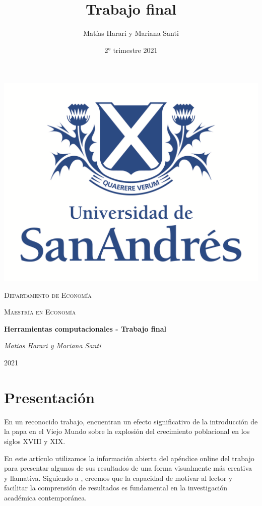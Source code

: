 \documentclass[10.5pt]{article}   %
\title{Trabajo final}
\author{Matías Harari y Mariana Santi}
\date{2° trimestre 2021}
\begin{document}
\renewcommand{\thesubsection}{\thesection.\alph{subsection}}

\thispagestyle{empty}
\setlength\headheight{0pt} 
\begin{center}

\begin{center}
\includegraphics[width=0.65\linewidth]{imgs/logoudesa.png}            
\end{center}	

        \vspace{0.2cm}
        {\scshape\LARGE Departamento de Economía \par}
        \vspace{0.2cm}
        {\scshape\Large Maestría en Economía\par}
        \vspace{0.4cm}

        {\Large\bfseries Herramientas computacionales - Trabajo final}
        
        \vspace{1cm}
        {\Large\itshape Matias Harari y Mariana Santi \par}


\vspace{1cm} 
\large
{2021}

\end{center}

\clearpage
\justify
\section*{Presentación}
En un reconocido trabajo, \cite{nunn2011potato} encuentran un efecto significativo de la introducción de la papa en el Viejo Mundo sobre la explosión del crecimiento poblacional en los siglos XVIII y XIX.


En este artículo utilizamos la información abierta del apéndice online del trabajo para presentar algunos de sus resultados de una forma visualmente más creativa y llamativa. Siguiendo a \cite{schwabish2014economist}, creemos que la capacidad de motivar al lector y facilitar la comprensión de resultados es fundamental en la investigación académica contemporánea.  
\end{document}
